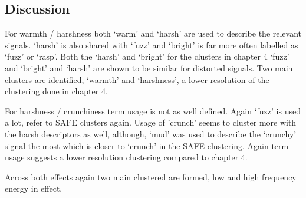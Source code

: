 	\subsection{Discussion}
	\label{sec:PerceptualExperiments-SemanticControl-Discussion}
		\note
		{
			For warmth / harshness both `warm' and `harsh' are used to describe the relevant signals. `harsh' is
			also shared with `fuzz' and `bright' is far more often labelled as `fuzz' or `rasp'. Both the
			`harsh' and `bright' for the clusters in chapter 4 `fuzz' and `bright' and `harsh' are shown to be
			similar for distorted signals. Two main clusters are identified, `warmth' and `harshness', a lower
			resolution of the clustering done in chapter 4.

			For harshness / crunchiness term usage is not as well defined. Again `fuzz' is used a lot, refer to
			SAFE clusters again. Usage of 'crunch' seems to cluster more with the harsh descriptors as well,
			although, `mud' was used to describe the `crunchy' signal the most which is closer to `crunch' in
			the SAFE clustering. Again term usage suggests a lower resolution clustering compared to chapter 4.

			Across both effects again two main clustered are formed, low and high frequency energy in effect.
		}
